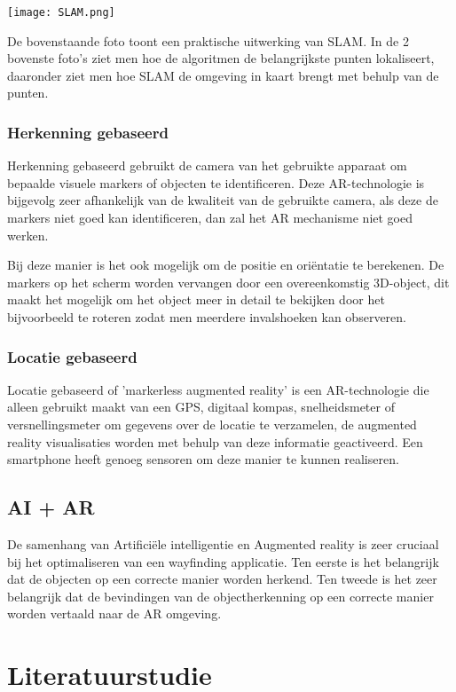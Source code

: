 \begin{center}
	\texttt{[image: SLAM.png]}
\end{center}

De bovenstaande foto toont een praktische uitwerking van SLAM. In de 2 bovenste foto's ziet men hoe de algoritmen de belangrijkste punten lokaliseert, daaronder ziet men hoe SLAM de omgeving in kaart brengt met behulp van de punten.

\subsubsection{Herkenning gebaseerd}
Herkenning gebaseerd gebruikt de camera van het gebruikte apparaat om bepaalde visuele markers of objecten te identificeren. Deze AR-technologie is bijgevolg zeer afhankelijk van de kwaliteit van de gebruikte camera, als deze de markers niet goed kan identificeren, dan zal het AR mechanisme niet goed werken.

Bij deze manier is het ook mogelijk om de positie en oriëntatie te berekenen. De markers op het scherm worden vervangen door een overeenkomstig 3D-object, dit maakt het mogelijk om het object meer in detail te bekijken door het bijvoorbeeld te roteren zodat men meerdere invalshoeken kan observeren.

\subsubsection{Locatie gebaseerd}
Locatie gebaseerd of 'markerless augmented reality' is een AR-technologie die alleen gebruikt maakt van een GPS, digitaal kompas, snelheidsmeter of versnellingsmeter om gegevens over de locatie te verzamelen, de augmented reality visualisaties worden met behulp van deze informatie geactiveerd. Een smartphone heeft genoeg sensoren om deze manier te kunnen realiseren. 

\subsection{AI + AR}
De samenhang van Artificiële intelligentie en Augmented reality is zeer cruciaal bij het optimaliseren van een wayfinding applicatie. Ten eerste is het belangrijk dat de objecten op een correcte manier worden herkend. Ten tweede is het zeer belangrijk dat de bevindingen van de objectherkenning op een correcte manier worden vertaald naar de AR omgeving. 

\newpage
\section{Literatuurstudie}

